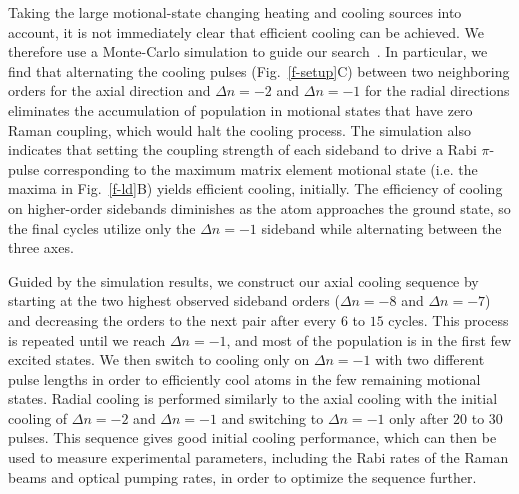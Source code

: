 \documentclass[aps,prl,twocolumn,groupedaddress]{revtex4-1}
\begin{document}
Taking the large motional-state changing heating and cooling sources
 into account,
it is not immediately clear that efficient cooling can be achieved.
We therefore use a Monte-Carlo simulation to guide our search~\cite{Dalibard1992}. 
In particular, we find that alternating the cooling pulses (Fig.~\ref{f-setup}C) between two
neighboring orders for the axial direction and $\Delta n=-2$ and $\Delta n=-1$ for the radial directions
eliminates the accumulation of population in motional states that have zero Raman coupling, which would halt the cooling process.
The simulation also indicates that setting the coupling strength of each  sideband
to drive a Rabi $\pi$-pulse corresponding to the maximum matrix element motional state
(i.e. the maxima in Fig.~\ref{f-ld}B)  yields efficient cooling, initially.
The efficiency of cooling on higher-order sidebands diminishes
as the atom approaches the ground state, so the final  cycles utilize only the $\Delta n=-1$ sideband while alternating between the three  axes.

Guided by the simulation results,
we construct our axial cooling sequence by starting at the two highest
observed  sideband orders ($\Delta n=-8$ and $\Delta n=-7$)
and decreasing the orders to the next pair after every $6$ to $15$ cycles.
This process is repeated until we reach $\Delta n=-1$, and most of the
population is in the first few excited states. We then switch to cooling only on $\Delta n=-1$ with two different pulse lengths in order to efficiently cool atoms in the
few remaining motional states.
Radial cooling is performed similarly to the axial cooling with the initial cooling of $\Delta n=-2$ and $\Delta n=-1$ and switching to $\Delta n=-1$ only after $20$ to $30$ pulses.
This sequence gives good initial cooling performance, which can then be used to measure experimental
parameters, including the Rabi rates of the Raman beams and optical pumping rates,
in order to optimize the sequence further.
\end{document}
